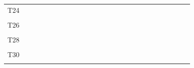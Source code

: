 \documentclass[
]{article}
\begin{document}
\begin{longtable}[l]{lllllllllllllllllllllllll}
T24 &  &  &  &  &  &  &  &  &  &  &  &  &  &  &  &  &  &  &  &  &  &  &  & \\
\cellcolor{gray!6}{T25} & \cellcolor{gray!6}{} & \cellcolor{gray!6}{} & \cellcolor{gray!6}{} & \cellcolor{gray!6}{} & \cellcolor{gray!6}{} & \cellcolor{gray!6}{} & \cellcolor{gray!6}{} & \cellcolor{gray!6}{} & \cellcolor{gray!6}{} & \cellcolor{gray!6}{} & \cellcolor{gray!6}{} & \cellcolor{gray!6}{} & \cellcolor{gray!6}{} & \cellcolor{gray!6}{} & \cellcolor{gray!6}{} & \cellcolor{gray!6}{} & \cellcolor{gray!6}{} & \cellcolor{gray!6}{} & \cellcolor{gray!6}{} & \cellcolor{gray!6}{} & \cellcolor{gray!6}{} & \cellcolor{gray!6}{} & \cellcolor{gray!6}{} & \cellcolor{gray!6}{}\\
\addlinespace
T26 &  &  &  &  &  &  &  &  &  &  &  &  &  &  &  &  &  &  &  &  &  &  &  & \\
\cellcolor{gray!6}{T27} & \cellcolor{gray!6}{} & \cellcolor{gray!6}{} & \cellcolor{gray!6}{} & \cellcolor{gray!6}{} & \cellcolor{gray!6}{} & \cellcolor{gray!6}{} & \cellcolor{gray!6}{} & \cellcolor{gray!6}{} & \cellcolor{gray!6}{} & \cellcolor{gray!6}{} & \cellcolor{gray!6}{} & \cellcolor{gray!6}{} & \cellcolor{gray!6}{} & \cellcolor{gray!6}{} & \cellcolor{gray!6}{} & \cellcolor{gray!6}{} & \cellcolor{gray!6}{} & \cellcolor{gray!6}{} & \cellcolor{gray!6}{} & \cellcolor{gray!6}{} & \cellcolor{gray!6}{} & \cellcolor{gray!6}{} & \cellcolor{gray!6}{} & \cellcolor{gray!6}{}\\
T28 &  &  &  &  &  &  &  &  &  &  &  &  &  &  &  &  &  &  &  &  &  &  &  & \\
\cellcolor{gray!6}{T29} & \cellcolor{gray!6}{} & \cellcolor{gray!6}{} & \cellcolor{gray!6}{} & \cellcolor{gray!6}{} & \cellcolor{gray!6}{} & \cellcolor{gray!6}{} & \cellcolor{gray!6}{} & \cellcolor{gray!6}{} & \cellcolor{gray!6}{} & \cellcolor{gray!6}{} & \cellcolor{gray!6}{} & \cellcolor{gray!6}{} & \cellcolor{gray!6}{} & \cellcolor{gray!6}{} & \cellcolor{gray!6}{} & \cellcolor{gray!6}{} & \cellcolor{gray!6}{} & \cellcolor{gray!6}{} & \cellcolor{gray!6}{} & \cellcolor{gray!6}{} & \cellcolor{gray!6}{} & \cellcolor{gray!6}{} & \cellcolor{gray!6}{} & \cellcolor{gray!6}{}\\
T30 &  &  &  &  &  &  &  &  &  &  &  &  &  &  &  &  &  &  &  &  &  &  &  & \\
\addlinespace
\cellcolor{gray!6}{T31} & \cellcolor{gray!6}{} & \cellcolor{gray!6}{} & \cellcolor{gray!6}{} & \cellcolor{gray!6}{} & \cellcolor{gray!6}{} & \cellcolor{gray!6}{} & \cellcolor{gray!6}{} & \cellcolor{gray!6}{} & \cellcolor{gray!6}{} & \cellcolor{gray!6}{} & \cellcolor{gray!6}{} & \cellcolor{gray!6}{} & \cellcolor{gray!6}{} & \cellcolor{gray!6}{} & \cellcolor{gray!6}{} & \cellcolor{gray!6}{} & \cellcolor{gray!6}{} & \cellcolor{gray!6}{} & \cellcolor{gray!6}{} & \cellcolor{gray!6}{} & \cellcolor{gray!6}{} & \cellcolor{gray!6}{} & \cellcolor{gray!6}{} & \cellcolor{gray!6}{}\\

\end{longtable}
\end{document}
